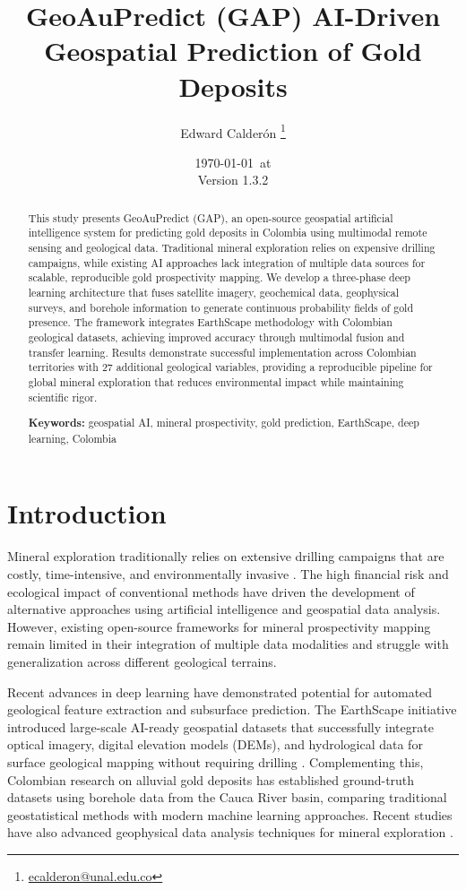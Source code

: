 \documentclass[12pt,a4paper]{article}
\title{GeoAuPredict (GAP) AI-Driven Geospatial Prediction of Gold Deposits}
\author{Edward Calderón \thanks{\href{mailto:ecalderon@unal.edu.co}{ecalderon@unal.edu.co}}}
\affil{Universidad Nacional de Colombia}
\date{\today\ at \currenttime \\ {\small Version 1.3.2}}
\begin{document}
\maketitle

\begin{abstract}
This study presents GeoAuPredict (GAP), an open-source geospatial artificial intelligence system for predicting gold deposits in Colombia using multimodal remote sensing and geological data. Traditional mineral exploration relies on expensive drilling campaigns, while existing AI approaches lack integration of multiple data sources for scalable, reproducible gold prospectivity mapping. We develop a three-phase deep learning architecture that fuses satellite imagery, geochemical data, geophysical surveys, and borehole information to generate continuous probability fields of gold presence. The framework integrates EarthScape methodology with Colombian geological datasets, achieving improved accuracy through multimodal fusion and transfer learning. Results demonstrate successful implementation across Colombian territories with 27 additional geological variables, providing a reproducible pipeline for global mineral exploration that reduces environmental impact while maintaining scientific rigor.

\textbf{Keywords:} geospatial AI, mineral prospectivity, gold prediction, EarthScape, deep learning, Colombia
\end{abstract}

\section{Introduction}

Mineral exploration traditionally relies on extensive drilling campaigns that are costly, time-intensive, and environmentally invasive \citep{traditional_exploration}. The high financial risk and ecological impact of conventional methods have driven the development of alternative approaches using artificial intelligence and geospatial data analysis. However, existing open-source frameworks for mineral prospectivity mapping remain limited in their integration of multiple data modalities and struggle with generalization across different geological terrains.

Recent advances in deep learning have demonstrated potential for automated geological feature extraction and subsurface prediction. The EarthScape initiative introduced large-scale AI-ready geospatial datasets that successfully integrate optical imagery, digital elevation models (DEMs), and hydrological data for surface geological mapping without requiring drilling \citep{massey2025earthscape}. Complementing this, Colombian research on alluvial gold deposits has established ground-truth datasets using borehole data from the Cauca River basin, comparing traditional geostatistical methods with modern machine learning approaches. Recent studies have also advanced geophysical data analysis techniques for mineral exploration \citep{springer2025}.
\end{document}
